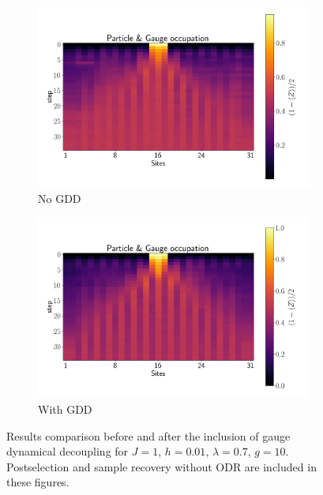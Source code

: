 \documentclass[a4paper]{article}
\begin{document}
\begin{figure}
    \centering
    \begin{subfigure}[c]{0.45\textwidth}
        \centering
        \includegraphics[width=\textwidth]{Results figs/hardware_postselection_z2pairquench_maxt_8_steps_35_L_16_J_1.0000_h_0.0500_lamb_0.7000_g_5_pp_7_pl_1_dc_XY4_xbasis_False.png}
        \caption{No GDD}
    \end{subfigure}
    \begin{subfigure}[c]{0.45\textwidth}
        \centering
        \includegraphics[width=\textwidth]{Results figs/hardware_postselection_z2pairquench_maxt_8_steps_35_L_16_J_1.0000_h_0.0500_lamb_0.7000_g_10_pp_7_pl_1_dc_XY4_xbasis_False.png}
        \caption{With GDD}
    \end{subfigure}
    \caption{Results comparison before and after the inclusion of gauge dynamical decoupling for $J = 1$, $h = 0.01$, $\lambda = 0.7$, $g = 10$. Postselection and sample recovery without ODR are included in these figures.}
    \label{fig:gauge_dynamical_decoupling}
\end{figure}
\end{document}

